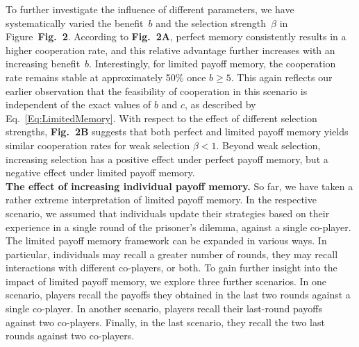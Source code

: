 \documentclass[11pt]{article}
\newcommand{\FigDependenceParameters}{{\bf Fig.~2}}
\theoremstyle{plainCl1}
\theoremstyle{plainCl2}
\begin{document}

To further investigate the influence of different parameters, we have systematically varied the benefit~$b$ and the selection strength~$\beta$ in Figure~\FigDependenceParameters.
According to \FigDependenceParameters \textbf{A}, perfect memory consistently results in a higher cooperation rate, and this relative advantage further increases with an increasing benefit~$b$. 
Interestingly, for limited payoff memory, the cooperation rate remains stable at approximately 50\% once \(b \!\ge\! 5\).
This again reflects our earlier observation that the feasibility of cooperation in this scenario is independent of the exact values of $b$ and $c$, as described by Eq.~\eqref{Eq:LimitedMemory}. 
With respect to the effect of different selection strengths, \FigDependenceParameters\textbf{B} suggests that both perfect and limited payoff memory yields similar cooperation rates for weak selection \(\beta \!<\! 1\). 
Beyond weak selection, increasing selection has a positive effect under perfect payoff memory, but a negative effect under limited payoff memory.\\



\noindent 
{\bf The effect of increasing individual payoff memory.}
So far, we have taken a rather extreme interpretation of limited payoff memory. 
In the respective scenario, we assumed that individuals update their strategies based on their experience in a single round of the prisoner's dilemma, against a single co-player. 
The limited payoff memory framework can be expanded in various ways. 
In particular, individuals may recall a greater number of rounds, they may recall interactions with different co-players, or both. 
To gain further insight into the impact of limited payoff memory, we explore three further scenarios. 
In one scenario, players recall the payoffs they obtained in the last two rounds against a single co-player. 
In another scenario, players recall their last-round payoffs against two co-players. 
Finally, in the last scenario, they recall the two last rounds against two co-players. 
\end{document}

